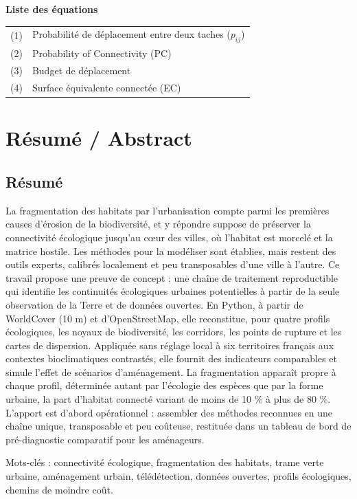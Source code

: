 \documentclass[a4paper,11pt]{report}
\begin{document}
\tableofcontents
\listoffigures
\listoftables
\clearpage
{\noindent\Large\bfseries Liste des équations}\par\medskip
\begin{tabular}{@{}ll@{}}
(1) & Probabilité de déplacement entre deux taches ($p_{ij}$)\\
(2) & Probability of Connectivity (PC)\\
(3) & Budget de déplacement\\
(4) & Surface équivalente connectée (EC)\\
\end{tabular}
\clearpage
\chapter*{Résumé / Abstract}

\section*{Résumé}

La fragmentation des habitats par l'urbanisation compte parmi les premières causes d'érosion de la biodiversité, et y répondre suppose de préserver la connectivité écologique jusqu'au c\oe{}ur des villes, où l'habitat est morcelé et la matrice hostile. Les méthodes pour la modéliser sont établies, mais restent des outils experts, calibrés localement et peu transposables d'une ville à l'autre. Ce travail propose une preuve de concept : une chaîne de traitement reproductible qui identifie les continuités écologiques urbaines potentielles à partir de la seule observation de la Terre et de données ouvertes. En Python, à partir de WorldCover (10 m) et d'OpenStreetMap, elle reconstitue, pour quatre profils écologiques, les noyaux de biodiversité, les corridors, les points de rupture et les cartes de dispersion. Appliquée sans réglage local à six territoires français aux contextes bioclimatiques contrastés, elle fournit des indicateurs comparables et simule l'effet de scénarios d'aménagement. La fragmentation apparaît propre à chaque profil, déterminée autant par l'écologie des espèces que par la forme urbaine, la part d'habitat connecté variant de moins de 10 \% à plus de 80 \%. L'apport est d'abord opérationnel : assembler des méthodes reconnues en une chaîne unique, transposable et peu coûteuse, restituée dans un tableau de bord de pré-diagnostic comparatif pour les aménageurs.

Mots-clés : connectivité écologique, fragmentation des habitats, trame verte urbaine, aménagement urbain, télédétection, données ouvertes, profils écologiques, chemins de moindre coût.
\end{document}
